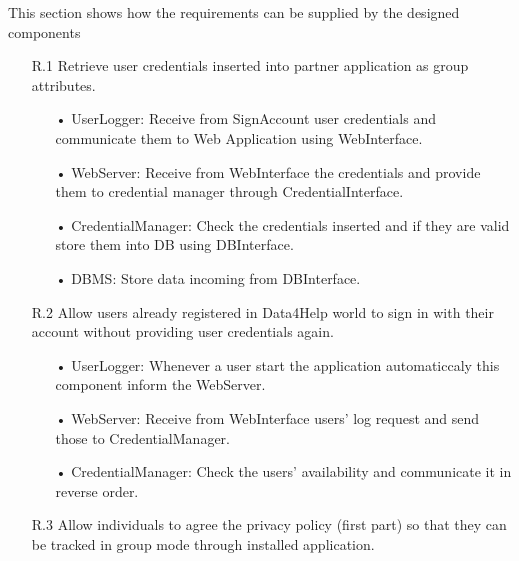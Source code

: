 This section shows how the requirements can be supplied by the designed components

\begin{enumerate}

\item [R.1] Retrieve user credentials inserted into partner application as group attributes.
	\begin{enumerate}
	\item[•] UserLogger: Receive from SignAccount user credentials and communicate them to Web Application using WebInterface.
	\item[•] WebServer: Receive from WebInterface the credentials and provide them to credential manager through CredentialInterface.
	\item[•] CredentialManager: Check the credentials inserted and if they are valid store them into DB using DBInterface.
	\item[•] DBMS: Store data incoming from DBInterface.
	\end{enumerate}

\item [R.2] Allow users already registered in Data4Help world to sign in with their account without providing user credentials again.
	\begin{enumerate}
	\item[•] UserLogger: Whenever a user start the application automaticcaly this component inform the WebServer.
	\item[•] WebServer: Receive from WebInterface users' log request and send those to CredentialManager.
	\item[•] CredentialManager: Check the users' availability and communicate it in reverse order.
	\end{enumerate}
	
\item [R.3] Allow individuals to agree the privacy policy (first part) so that they can be tracked in group mode through installed application.  
		
		

\end{enumerate}